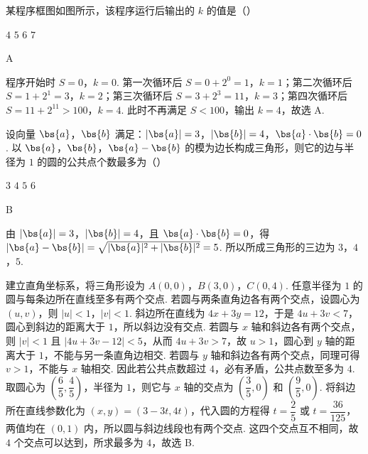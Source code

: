 \begin{problem}
某程序框图如图所示，该程序运行后输出的 \(k\) 的值是（\quad）


\choices
    {\(4\)}
    {\(5\)}
    {\(6\)}
    {\(7\)}
\end{problem}

\begin{answer}
A
\end{answer}

\begin{solution}
程序开始时 \(S=0\)，\(k=0\). 第一次循环后 \(S=0+2^0=1\)，\(k=1\)；第二次循环后 \(S=1+2^1=3\)，\(k=2\)；第三次循环后 \(S=3+2^3=11\)，\(k=3\)；第四次循环后 \(S=11+2^{11}>100\)，\(k=4\). 此时不再满足 \(S<100\)，输出 \(k=4\)，故选 A.
\end{solution}

\begin{problem}
设向量 \(\bs{a}\)，\(\bs{b}\) 满足：\(|\bs{a}|=3\)，\(|\bs{b}|=4\)，\(\bs{a}\cdot\bs{b}=0\). 以 \(\bs{a}\)，\(\bs{b}\)，\(\bs{a}-\bs{b}\) 的模为边长构成三角形，则它的边与半径为 \(1\) 的圆的公共点个数最多为（\quad）

\choices
    {\(3\)}
    {\(4\)}
    {\(5\)}
    {\(6\)}
\end{problem}

\begin{answer}
B
\end{answer}

\begin{solution}
由 \(|\bs{a}|=3\)，\(|\bs{b}|=4\)，且 \(\bs{a}\cdot\bs{b}=0\)，得 \(|\bs{a}-\bs{b}|=\sqrt{|\bs{a}|^2+|\bs{b}|^2}=5\). 所以所成三角形的三边为 \(3\)，\(4\)，\(5\).

建立直角坐标系，将三角形设为 \(A(0,0)\)，\(B(3,0)\)，\(C(0,4)\). 任意半径为 \(1\) 的圆与每条边所在直线至多有两个交点. 若圆与两条直角边各有两个交点，设圆心为 \((u,v)\)，则 \(|u|<1\)，\(|v|<1\). 斜边所在直线为 \(4x+3y=12\)，于是 \(4u+3v<7\)，圆心到斜边的距离大于 \(1\)，所以斜边没有交点. 若圆与 \(x\) 轴和斜边各有两个交点，则 \(|v|<1\) 且 \(|4u+3v-12|<5\)，从而 \(4u+3v>7\)，故 \(u>1\)，圆心到 \(y\) 轴的距离大于 \(1\)，不能与另一条直角边相交. 若圆与 \(y\) 轴和斜边各有两个交点，同理可得 \(v>1\)，不能与 \(x\) 轴相交. 因此若公共点数超过 \(4\)，必有矛盾，公共点数至多为 \(4\). 取圆心为 \(\left(\dfrac65,\dfrac45\right)\)，半径为 \(1\)，则它与 \(x\) 轴的交点为 \(\left(\dfrac35,0\right)\) 和 \(\left(\dfrac95,0\right)\). 将斜边所在直线参数化为 \((x,y)=(3-3t,4t)\)，代入圆的方程得 \(t=\dfrac25\) 或 \(t=\dfrac{36}{125}\)，两值均在 \((0,1)\) 内，所以圆与斜边线段也有两个交点. 这四个交点互不相同，故 \(4\) 个交点可以达到，所求最多为 \(4\)，故选 B.
\end{solution}

